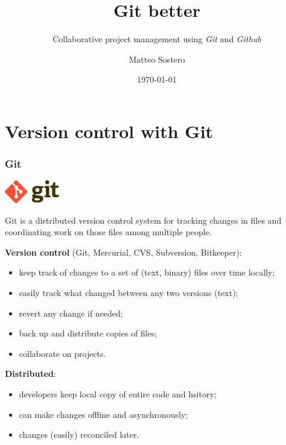 \documentclass[10pt,svgnames]{beamer}
\title{Git better}
\subtitle{Collaborative project management using \emph{Git} and \emph{Github}}
\date{\today}
\author{Matteo Sostero}
\institute{Sant'Anna School of Advanced Studies}
\begin{document}
\maketitle



\section{Version control with Git}

\begin{frame}
\frametitle{Git}
\includegraphics[height=1cm]{Git-logo}

Git is a distributed version control system for tracking changes in files and coordinating work on those files among multiple people.

\textbf{Version control} (Git, Mercurial, CVS, Subversion, Bitkeeper):
\begin{itemize}
   \item keep track of changes to a set of (text, binary) files over time locally;
   \item easily track what changed between any two versions (text);
   \item revert any change if needed;
   \item back up and distribute copies of files;
   \item collaborate on projects.
 \end{itemize} 

\textbf{Distributed}:
\begin{itemize}
  \item developers keep local copy of entire code and hsitory;
  \item can make changes offline and asynchronously;
  \item changes (easily) reconciled later.
\end{itemize}
\end{frame}
\end{document}

